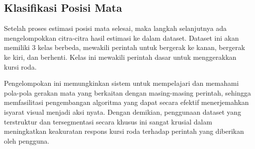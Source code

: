 \subsection{Klasifikasi Posisi Mata}
Setelah proses estimasi posisi mata selesai, maka langkah selanjutnya ada mengelompokkan citra-citra hasil estimasi ke dalam dataset. Dataset ini akan memiliki 3 kelas berbeda, mewakili perintah untuk bergerak ke kanan, bergerak ke kiri, dan berhenti. Kelas ini mewakili perintah dasar untuk menggerakkan kursi roda. 

Pengelompokan ini memungkinkan sistem untuk mempelajari dan memahami pola-pola gerakan mata yang berkaitan dengan masing-masing perintah, sehingga memfasilitasi pengembangan algoritma yang dapat secara efektif menerjemahkan isyarat visual menjadi aksi nyata. Dengan demikian, penggunaan dataset yang terstruktur dan tersegmentasi secara khusus ini sangat krusial dalam meningkatkan keakuratan respons kursi roda terhadap perintah yang diberikan oleh pengguna.

